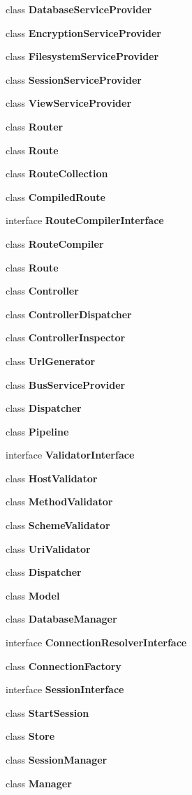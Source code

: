 \begin{DoxyCompactItemize}
\item 
class {\bf Database\+Service\+Provider}
\item 
class {\bf Encryption\+Service\+Provider}
\item 
class {\bf Filesystem\+Service\+Provider}
\item 
class {\bf Session\+Service\+Provider}
\item 
class {\bf View\+Service\+Provider}
\item 
class {\bf Router}
\item 
class {\bf Route}
\item 
class {\bf Route\+Collection}
\item 
class {\bf Compiled\+Route}
\item 
interface {\bf Route\+Compiler\+Interface}
\item 
class {\bf Route\+Compiler}
\item 
class {\bf Route}
\item 
class {\bf Controller}
\item 
class {\bf Controller\+Dispatcher}
\item 
class {\bf Controller\+Inspector}
\item 
class {\bf Url\+Generator}
\item 
class {\bf Bus\+Service\+Provider}
\item 
class {\bf Dispatcher}
\item 
class {\bf Pipeline}
\item 
interface {\bf Validator\+Interface}
\item 
class {\bf Host\+Validator}
\item 
class {\bf Method\+Validator}
\item 
class {\bf Scheme\+Validator}
\item 
class {\bf Uri\+Validator}
\item 
class {\bf Dispatcher}
\item 
class {\bf Model}
\item 
class {\bf Database\+Manager}
\item 
interface {\bf Connection\+Resolver\+Interface}
\item 
class {\bf Connection\+Factory}
\item 
interface {\bf Session\+Interface}
\item 
class {\bf Start\+Session}
\item 
class {\bf Store}
\item 
class {\bf Session\+Manager}
\item 
class {\bf Manager}

\end{DoxyCompactItemize}
